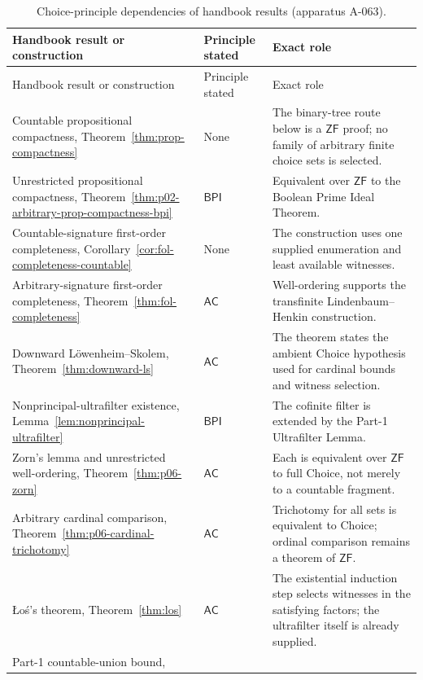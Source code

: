 \begingroup\small
\begin{longtable}{@{}p{}p{}p{}@{}}
\caption{Choice-principle dependencies of handbook results (apparatus A-063).}
\label{tab:p06-choice-dependencies}\\
\toprule
Handbook result or construction & Principle stated & Exact role \\
\midrule
\endfirsthead
\toprule
Handbook result or construction & Principle stated & Exact role \\
\midrule
\endhead
Countable propositional compactness,
Theorem~\ref{thm:prop-compactness} & None & The binary-tree route below is a
\(\mathsf{ZF}\) proof; no family of arbitrary finite choice sets is selected. \\
Unrestricted propositional compactness,
Theorem~\ref{thm:p02-arbitrary-prop-compactness-bpi} & \(\mathsf{BPI}\) &
Equivalent over \(\mathsf{ZF}\) to the Boolean Prime Ideal Theorem. \\
Countable-signature first-order completeness,
Corollary~\ref{cor:fol-completeness-countable} & None & The construction
uses one supplied enumeration and least available witnesses. \\
Arbitrary-signature first-order completeness,
Theorem~\ref{thm:fol-completeness} & \(\mathsf{AC}\) & Well-ordering
supports the transfinite Lindenbaum--Henkin construction. \\
Downward L\"owenheim--Skolem,
Theorem~\ref{thm:downward-ls} & \(\mathsf{AC}\) & The theorem states the
ambient Choice hypothesis used for cardinal bounds and witness selection. \\
Nonprincipal-ultrafilter existence,
Lemma~\ref{lem:nonprincipal-ultrafilter} & \(\mathsf{BPI}\) & The
cofinite filter is extended by the Part-1 Ultrafilter Lemma. \\
Zorn's lemma and unrestricted well-ordering,
Theorem~\ref{thm:p06-zorn} & \(\mathsf{AC}\) & Each is equivalent over
\(\mathsf{ZF}\) to full Choice, not merely to a countable fragment. \\
Arbitrary cardinal comparison,
Theorem~\ref{thm:p06-cardinal-trichotomy} & \(\mathsf{AC}\) & Trichotomy for
all sets is equivalent to Choice; ordinal comparison remains a theorem of
\(\mathsf{ZF}\). \\
\L o\'s's theorem, Theorem~\ref{thm:los} & \(\mathsf{AC}\) & The
existential induction step selects witnesses in the satisfying factors; the
ultrafilter itself is already supplied. \\
Part-1 countable-union bound,

\end{longtable}
